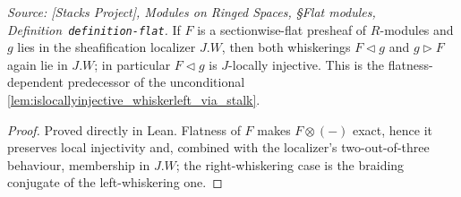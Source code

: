 \begin{lemma}
  \label{lem:flat_preserves_W}
  \textit{Source: [Stacks Project], Modules on Ringed Spaces, \S Flat modules,
  Definition~\texttt{definition-flat}.}
  If \(F\) is a sectionwise-flat presheaf of \(R\)-modules and \(g\) lies in the
  sheafification localizer \(J.W\), then both whiskerings \(F \triangleleft g\) and
  \(g \triangleright F\) again lie in \(J.W\); in particular \(F \triangleleft g\) is
  \(J\)-locally injective. This is the flatness-dependent predecessor of the
  unconditional \cref{lem:islocallyinjective_whiskerleft_via_stalk}.
\end{lemma}
\begin{proof}
  Proved directly in Lean. Flatness of \(F\) makes \(F \otimes (-)\) exact, hence it
  preserves local injectivity and, combined with the localizer's two-out-of-three
  behaviour, membership in \(J.W\); the right-whiskering case is the braiding conjugate
  of the left-whiskering one.
\end{proof}

